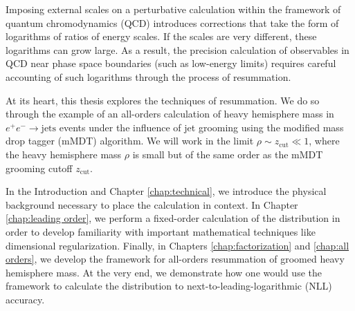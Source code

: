 \documentclass[../thesis.tex]{subfiles}
\providecommand{\zcut}{z_\mathrm{{cut}}}
\begin{document}
	Imposing external scales on a perturbative calculation within the framework of quantum chromodynamics (QCD) introduces corrections that take the form of logarithms of ratios of energy scales. If the scales are very different, these logarithms can grow large. As a result, the precision calculation of observables in QCD near phase space boundaries (such as low-energy limits) requires careful accounting of such logarithms through the process of resummation. 

	At its heart, this thesis explores the techniques of resummation. We do so through the example of an all-orders calculation of heavy hemisphere mass in $e^+ e^- \to \text{jets}$ events under the influence of jet grooming using the modified mass drop tagger (mMDT) algorithm. We will work in the limit $\rho \sim \zcut \ll 1$, where the heavy hemisphere mass $\rho$ is small but of the same order as the mMDT grooming cutoff $\zcut$.

	In the Introduction and Chapter \ref{chap:technical}, we introduce the physical background necessary to place the calculation in context. In Chapter \ref{chap:leading order}, we perform a fixed-order calculation of the distribution in order to develop familiarity with important mathematical techniques like dimensional regularization. Finally, in Chapters \ref{chap:factorization} and \ref{chap:all orders}, we develop the framework for all-orders resummation of groomed heavy hemisphere mass. At the very end, we demonstrate how one would use the framework to calculate the distribution to next-to-leading-logarithmic (NLL) accuracy.
\end{document}
